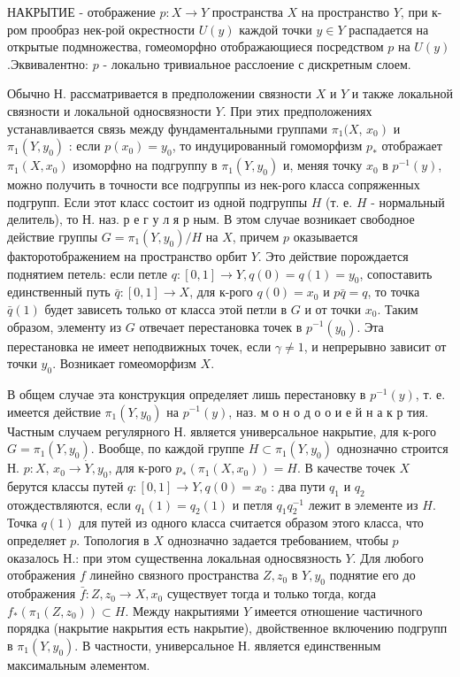 \documentclass[10pt]{article}
\begin{document}
НАКРЫТИЕ - отображение $p: X \rightarrow Y$ пространства $X$ на пространство $Y$, при к-ром прообраз нек-рой окрестности $U(y)$ каждой точки $y \in Y$ распадается на открытые подмножества, гомеоморфно отображающиеся посредством $p$ на $U(y)$.Эквивалентно: $p$ - локально тривиальное расслоение с дискретным слоем.



Обычно Н. рассматривается в предположении связности $X$ и $Y$ и также локальной связности и локальной односвязности $Y$. При этих предположениях устанавливается связь между фундаментальными группами $\pi_{1}(X$, $\left.x_{0}\right)$ и $\pi_{1}\left(Y, y_{0}\right)$ : если $p\left(x_{0}\right)=y_{0}$, то индуцированный гомоморфизм $p_{*}$ отображает $\pi_{1}\left(X, x_{0}\right)$ изоморфно на подгруппу в $\pi_{1}\left(Y, y_{0}\right)$ и, меняя точку $x_{0}$ в $p^{-1}(y)$, можно получить в точности все подгруппы из нек-рого класса сопряженных подгрупп. Если этот класс состоит из одной подгруппы $H$ (т. е. $H$ - нормальный делитель), то Н. наз. р е г у л я р ным. В этом случае возникает свободное действие группы $G=\pi_{1}\left(Y, y_{0}\right) / H$ на $X$, причем $p$ оказывается факторотображением на пространство орбит $Y$. Это действие порождается поднятием петель: если петле $q:[0,1] \rightarrow Y, q(0)=q(1)=y_{0}$, сопоставить единственный путь $\bar{q}:[0,1] \rightarrow X$, для к-рого $q(0)=x_{0}$ и $p \bar{q}=q$, то точка $\bar{q}(1)$ будет зависеть только от класса этой петли в $G$ и от точки $x_{0}$. Таким образом, элементу из $G$ отвечает перестановка точек в $p^{-1}\left(y_{0}\right)$. Эта перестановка не имеет неподвижных точек, если $\gamma \neq 1$, и непрерывно зависит от точки $y_{0}$. Возникает гомеоморфизм $X$.



В общем случае эта конструкция определяет лишь перестановку в $p^{-1}(y)$, т. е. имеется действие $\pi_{1}\left(Y, y_{0}\right)$ на $p^{-1}(y)$, наз. м о н о д о о и е й н а к р тия. Частным случаем регулярного Н. является универсальное накрытие, для к-рого $G=\pi_{1}\left(Y, y_{0}\right)$. Вообще, по каждой группе $H \subset \pi_{1}\left(Y, y_{0}\right)$ однозначно строится Н. $p: X$, $x_{0} \rightarrow \dot{Y}, y_{0}$, для к-рого $p_{*}\left(\pi_{1}\left(X, x_{0}\right)\right)=H$. В качестве точек $X$ берутся классы путей $q:[0,1] \rightarrow Y, q(0)=x_{0}$ : два пути $q_{1}$ и $q_{2}$ отождествляются, если $q_{1}(1)=q_{2}(1)$ и петля $q_{1} q_{2}^{-1}$ лежит в элементе из $H$. Точка $q(1)$ для путей из одного класса считается образом этого класса, что определяет $p$. Топология в $X$ однозначно задается требованием, чтобы $p$ оказалось Н.: при этом существенна локальная односвязность $Y$. Для любого отображения $f$ линейно связного пространства $Z, z_{0}$ в $Y, y_{0}$ поднятие его до отображения $\bar{f}: Z, z_{0} \rightarrow X, x_{0}$ существует тогда и только тогда, когда $f_{*}\left(\pi_{1}\left(Z, z_{0}\right)\right) \subset H$. Между накрытиями $Y$ имеется отношение частичного порядка (накрытие накрытия есть накрытие), двойственное включению подгрупп в $\pi_{1}\left(Y, y_{0}\right)$. В частности, универсальное Н. является единственным максимальным әлементом.
\end{document}
